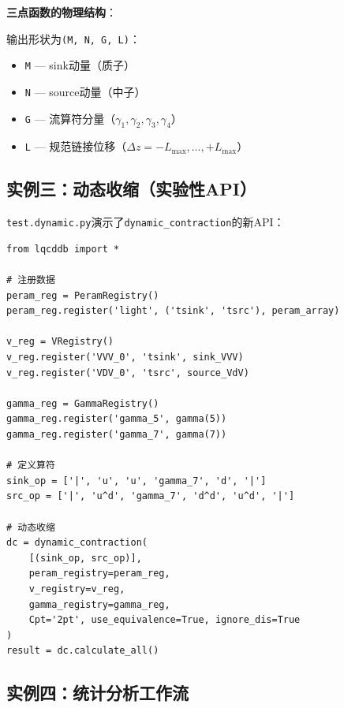\documentclass[11pt,a4paper]{ctexart}
\begin{document}
\textbf{三点函数的物理结构}：

输出形状为\texttt{(M, N, G, L)}：
\begin{itemize}
\item \texttt{M} — sink动量（质子）
\item \texttt{N} — source动量（中子）
\item \texttt{G} — 流算符分量（$\gamma_1, \gamma_2, \gamma_3, \gamma_4$）
\item \texttt{L} — 规范链接位移（$\Delta z = -L_{\max}, \dots, +L_{\max}$）
\end{itemize}

\subsection{实例三：动态收缩（实验性API）}

\texttt{test.dynamic.py}演示了\texttt{dynamic\_contraction}的新API：

\begin{codebox}[动态收缩API实例]
\begin{lstlisting}[style=python]
from lqcddb import *

# 注册数据
peram_reg = PeramRegistry()
peram_reg.register('light', ('tsink', 'tsrc'), peram_array)

v_reg = VRegistry()
v_reg.register('VVV_0', 'tsink', sink_VVV)
v_reg.register('VDV_0', 'tsrc', source_VdV)

gamma_reg = GammaRegistry()
gamma_reg.register('gamma_5', gamma(5))
gamma_reg.register('gamma_7', gamma(7))

# 定义算符
sink_op = ['|', 'u', 'u', 'gamma_7', 'd', '|']
src_op = ['|', 'u^d', 'gamma_7', 'd^d', 'u^d', '|']

# 动态收缩
dc = dynamic_contraction(
    [(sink_op, src_op)],
    peram_registry=peram_reg,
    v_registry=v_reg,
    gamma_registry=gamma_reg,
    Cpt='2pt', use_equivalence=True, ignore_dis=True
)
result = dc.calculate_all()
\end{lstlisting}
\end{codebox}

\subsection{实例四：统计分析工作流}
\end{document}

